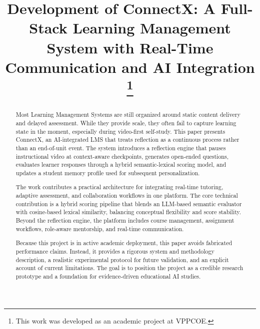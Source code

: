 \documentclass[conference]{IEEEtran}
\begin{document}
\title{Development of ConnectX: A Full-Stack Learning Management System with Real-Time Communication and AI Integration%
\thanks{This work was developed as an academic project at VPPCOE.}
}

\author{
}

\maketitle

\begin{abstract}
Most Learning Management Systems are still organized around static content delivery and delayed assessment. While they provide scale, they often fail to capture learning state in the moment, especially during video-first self-study. This paper presents ConnectX, an AI-integrated LMS that treats reflection as a continuous process rather than an end-of-unit event. The system introduces a reflection engine that pauses instructional video at context-aware checkpoints, generates open-ended questions, evaluates learner responses through a hybrid semantic-lexical scoring model, and updates a student memory profile used for subsequent personalization.

The work contributes a practical architecture for integrating real-time tutoring, adaptive assessment, and collaboration workflows in one platform. The core technical contribution is a hybrid scoring pipeline that blends an LLM-based semantic evaluator with cosine-based lexical similarity, balancing conceptual flexibility and score stability. Beyond the reflection engine, the platform includes course management, assignment workflows, role-aware mentorship, and real-time communication.

Because this project is in active academic deployment, this paper avoids fabricated performance claims. Instead, it provides a rigorous system and methodology description, a realistic experimental protocol for future validation, and an explicit account of current limitations. The goal is to position the project as a credible research prototype and a foundation for evidence-driven educational AI studies.
\end{abstract}
\end{document}
